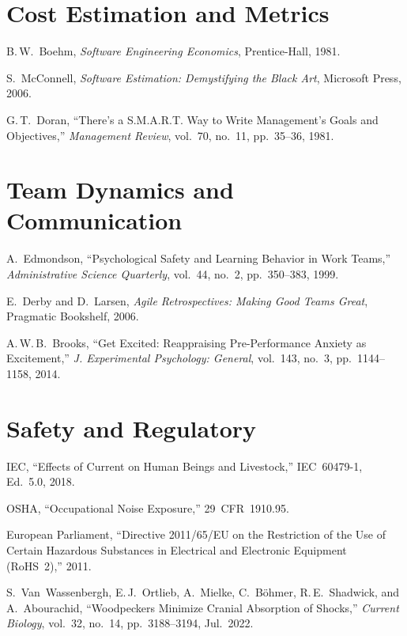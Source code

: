 \section*{Cost Estimation and Metrics}
\begin{enumerate}[label={[\arabic*]},leftmargin=2em,resume]
\item B.\,W.~Boehm, \emph{Software Engineering Economics}, Prentice-Hall, 1981.
\item S.~McConnell, \emph{Software Estimation: Demystifying the Black Art}, Microsoft Press, 2006.
\item G.\,T.~Doran, ``There's a S.M.A.R.T. Way to Write Management's Goals and Objectives,'' \emph{Management Review}, vol.~70, no.~11, pp.~35--36, 1981.
\end{enumerate}

\section*{Team Dynamics and Communication}
\begin{enumerate}[label={[\arabic*]},leftmargin=2em,resume]
\item A.~Edmondson, ``Psychological Safety and Learning Behavior in Work Teams,'' \emph{Administrative Science Quarterly}, vol.~44, no.~2, pp.~350--383, 1999.
\item E.~Derby and D.~Larsen, \emph{Agile Retrospectives: Making Good Teams Great}, Pragmatic Bookshelf, 2006.
\item A.\,W.\,B.~Brooks, ``Get Excited: Reappraising Pre-Performance Anxiety as Excitement,'' \emph{J. Experimental Psychology: General}, vol.~143, no.~3, pp.~1144--1158, 2014.
\end{enumerate}

\section*{Safety and Regulatory}
\begin{enumerate}[label={[\arabic*]},leftmargin=2em,resume]
\item IEC, ``Effects of Current on Human Beings and Livestock,'' IEC~60479-1, Ed.~5.0, 2018.
\item OSHA, ``Occupational Noise Exposure,'' 29~CFR~1910.95.
\item European Parliament, ``Directive 2011/65/EU on the Restriction of the Use of Certain Hazardous Substances in Electrical and Electronic Equipment (RoHS~2),'' 2011.
\item S.~Van~Wassenbergh, E.\,J.~Ortlieb, A.~Mielke, C.~B\"ohmer, R.\,E.~Shadwick, and A.~Abourachid, ``Woodpeckers Minimize Cranial Absorption of Shocks,'' \emph{Current Biology}, vol.~32, no.~14, pp.~3188--3194, Jul.\ 2022.
\end{enumerate}

